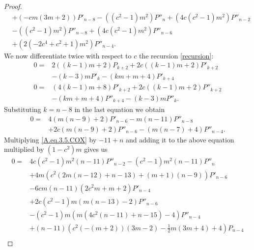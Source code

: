 \documentclass[review,nopreprintline]{elsarticle}
\theoremstyle{definition}
\numberwithin{equation}{section}
\theoremstyle{remark}
\begin{document}
\begin{proof}
\begin{align}
	            &+(-c m (3 m+2)) P'_{n-8} -\left(\left(c^2-1\right) m^2\right) P''_n +\left(4 c \left(c^2-1\right) m^2\right) P''_{n-2} \nonumber\\
	            &-\left(\left(c^2-1\right) m^2\right) P''_{n-8} +\left(4 c \left(c^2-1\right) m^2\right) P''_{n-6} \nonumber\\
	            &+\left(2 \left(-2 c^4+c^2+1\right) m^2\right) P''_{n-4} . \label{A.eq.3.5.COX}
	        \end{align}
	        We now differentiate twice with respect to $c$ the recursion \ref{recursion}:             
	        \begin{align}
	            0=&2 ((k-1) m+2) P_{k+2} +2 c ((k-1) m+2) P'_{k+2} \nonumber\\
	            &-(k-3) m P'_k -(k m+m+4) P'_{k+4} \label{A.eq.3.7.COX}\\
	            0=&(4 (k-1) m+8) P'_{k+2} +2 c ((k-1) m+2) P''_{k+2} \nonumber\\
	            &-(k m+m+4) P''_{k+4} -(k-3) m P''_k .\label{A.eq.3.8.COX}
	        \end{align}
	        Substituting $k=n-8$ in the last equation we obtain
	        \begin{align}
	            0=&4 (m (n-9)+2) P'_{n-6} -m (n-11) P''_{n-8} \nonumber\\
	            &+2 c (m (n-9)+2) P''_{n-6} -(m (n-7)+4) P''_{n-4} .
	        \end{align}
	        Multiplying \eqref{A.eq.3.5.COX} by $-11+n$  and adding it to the above equation multiplied by $(1-c^2) m$  gives us
	        \begin{align}
	            0=&4 c \left(c^2-1\right) m^2 (n-11) P''_{n-2} -\left(c^2-1\right) m^2 (n-11) P''_n \nonumber\\
	            &+4 m \left(c^2 (2 m (n-12)+n-13)+(m+1) (n-9)\right) P'_{n-6} \nonumber\\
	            &-6 c m (n-11) \left(2 c^2 m+m+2\right) P'_{n-4} \nonumber\\
	            &+2 c \left(c^2-1\right) m (m (n-13)-2) P''_{n-6} \nonumber\\
	            &-\left(c^2-1\right) m \left(m \left(4 c^2 (n-11)+n-15\right)-4\right) P''_{n-4} \nonumber\\
	            &+(n-11) \left(c^2 (-(m+2)) (3 m-2)-\frac{1}{2} m (3 m+4)+4\right) P_{n-4} \nonumber\\

\end{align}
\end{proof}
\end{document}
